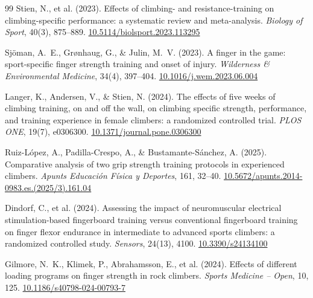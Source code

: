 \documentclass[12pt,a4paper]{article}
\begin{document}
\begin{thebibliography}{99}
Stien, N., et al. (2023).
Effects of climbing- and resistance-training on climbing-specific performance: a systematic review and meta-analysis.
\textit{Biology of Sport}, 40(3), 875--889.
\href{https://doi.org/10.5114/biolsport.2023.113295}{10.5114/biolsport.2023.113295}

Sjöman, A.~E., Grønhaug, G., \& Julin, M.~V. (2023).
A finger in the game: sport-specific finger strength training and onset of injury.
\textit{Wilderness \& Environmental Medicine}, 34(4), 397--404.
\href{https://doi.org/10.1016/j.wem.2023.06.004}{10.1016/j.wem.2023.06.004}

Langer, K., Andersen, V., \& Stien, N. (2024).
The effects of five weeks of climbing training, on and off the wall, on climbing specific strength, performance, and training experience in female climbers: a randomized controlled trial.
\textit{PLOS ONE}, 19(7), e0306300.
\href{https://doi.org/10.1371/journal.pone.0306300}{10.1371/journal.pone.0306300}

Ruiz-López, A., Padilla-Crespo, A., \& Bustamante-Sánchez, A. (2025).
Comparative analysis of two grip strength training protocols in experienced climbers.
\textit{Apunts Educación Física y Deportes}, 161, 32--40.
\href{https://doi.org/10.5672/apunts.2014-0983.es.(2025/3).161.04}{10.5672/apunts.2014-0983.es.(2025/3).161.04}

Dindorf, C., et al. (2024).
Assessing the impact of neuromuscular electrical stimulation-based fingerboard training versus conventional fingerboard training on finger flexor endurance in intermediate to advanced sports climbers: a randomized controlled study.
\textit{Sensors}, 24(13), 4100.
\href{https://doi.org/10.3390/s24134100}{10.3390/s24134100}

Gilmore, N.~K., Klimek, P., Abrahamsson, E., et al. (2024).
Effects of different loading programs on finger strength in rock climbers.
\textit{Sports Medicine -- Open}, 10, 125.
\href{https://doi.org/10.1186/s40798-024-00793-7}{10.1186/s40798-024-00793-7}

\end{thebibliography}
\end{document}
